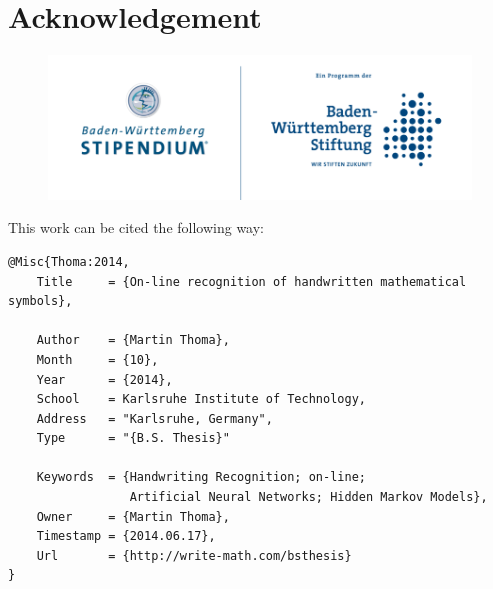 \chapter*{Acknowledgement}


\begin{figure}[h]
    \centering
\end{figure}

\begin{figure}[h]
    \centering
    \includegraphics*[width=\linewidth, keepaspectratio]{logos/bw-stipendium.png} 
\end{figure}

\clearpage

This work can be cited the following way:

\begin{verbatim}
@Misc{Thoma:2014,
    Title     = {On-line recognition of handwritten mathematical symbols},

    Author    = {Martin Thoma},
    Month     = {10},
    Year      = {2014},
    School    = Karlsruhe Institute of Technology,
    Address   = "Karlsruhe, Germany",
    Type      = "{B.S. Thesis}"

    Keywords  = {Handwriting Recognition; on-line;
                 Artificial Neural Networks; Hidden Markov Models},
    Owner     = {Martin Thoma},
    Timestamp = {2014.06.17},
    Url       = {http://write-math.com/bsthesis}
}
\end{verbatim}